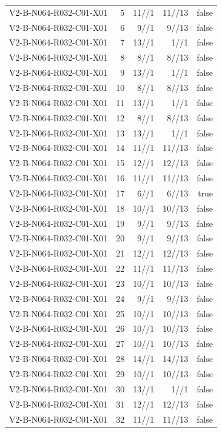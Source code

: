 {\begin{longtable}{lrrrr}
V2-B-N064-R032-C01-X01 & 5 & 11//1 & 11//13 & false \\
V2-B-N064-R032-C01-X01 & 6 & 9//1 & 9//13 & false \\
V2-B-N064-R032-C01-X01 & 7 & 13//1 & 1//1 & false \\
V2-B-N064-R032-C01-X01 & 8 & 8//1 & 8//13 & false \\
V2-B-N064-R032-C01-X01 & 9 & 13//1 & 1//1 & false \\
V2-B-N064-R032-C01-X01 & 10 & 8//1 & 8//13 & false \\
V2-B-N064-R032-C01-X01 & 11 & 13//1 & 1//1 & false \\
V2-B-N064-R032-C01-X01 & 12 & 8//1 & 8//13 & false \\
V2-B-N064-R032-C01-X01 & 13 & 13//1 & 1//1 & false \\
V2-B-N064-R032-C01-X01 & 14 & 11//1 & 11//13 & false \\
V2-B-N064-R032-C01-X01 & 15 & 12//1 & 12//13 & false \\
V2-B-N064-R032-C01-X01 & 16 & 11//1 & 11//13 & false \\
V2-B-N064-R032-C01-X01 & 17 & 6//1 & 6//13 & true \\
V2-B-N064-R032-C01-X01 & 18 & 10//1 & 10//13 & false \\
V2-B-N064-R032-C01-X01 & 19 & 9//1 & 9//13 & false \\
V2-B-N064-R032-C01-X01 & 20 & 9//1 & 9//13 & false \\
V2-B-N064-R032-C01-X01 & 21 & 12//1 & 12//13 & false \\
V2-B-N064-R032-C01-X01 & 22 & 11//1 & 11//13 & false \\
V2-B-N064-R032-C01-X01 & 23 & 10//1 & 10//13 & false \\
V2-B-N064-R032-C01-X01 & 24 & 9//1 & 9//13 & false \\
V2-B-N064-R032-C01-X01 & 25 & 10//1 & 10//13 & false \\
V2-B-N064-R032-C01-X01 & 26 & 10//1 & 10//13 & false \\
V2-B-N064-R032-C01-X01 & 27 & 10//1 & 10//13 & false \\
V2-B-N064-R032-C01-X01 & 28 & 14//1 & 14//13 & false \\
V2-B-N064-R032-C01-X01 & 29 & 10//1 & 10//13 & false \\
V2-B-N064-R032-C01-X01 & 30 & 13//1 & 1//1 & false \\
V2-B-N064-R032-C01-X01 & 31 & 12//1 & 12//13 & false \\
V2-B-N064-R032-C01-X01 & 32 & 11//1 & 11//13 & false \\

\end{longtable}}
